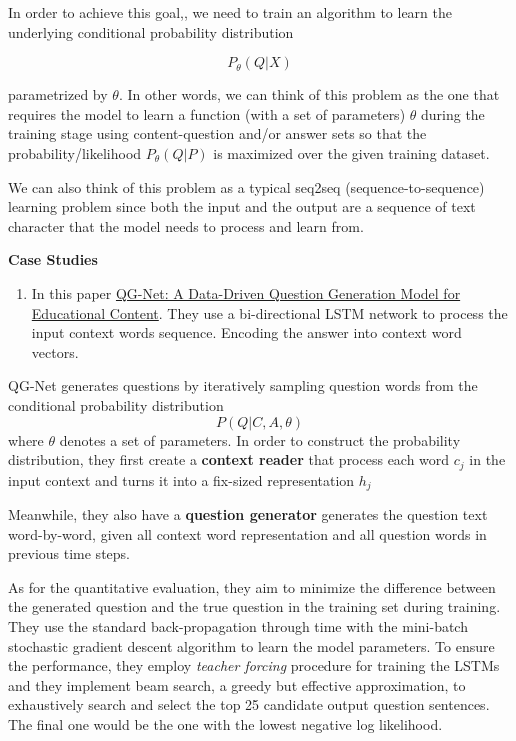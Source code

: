 \documentclass{acm_proc_article-sp}
\renewcommand{\paragraph}[1]{\vskip 6pt\noindent\textbf{#1 }}
\providecommand{\tightlist}{%
  \setlength{\itemsep}{0pt}\setlength{\parskip}{0pt}}
\begin{document}
In order to achieve this goal,, we need to train an algorithm to learn
the underlying conditional probability distribution

\[P_{\theta}(Q|X)\]

parametrized by \(\theta\). In other words, we can think of this problem
as the one that requires the model to learn a function (with a set of
parameters) \(\theta\) during the training stage using content-question
and/or answer sets so that the probability/likelihood
\(P_{\theta}(Q|P)\) is maximized over the given training dataset.

We can also think of this problem as a typical seq2seq
(sequence-to-sequence) learning problem since both the input and the
output are a sequence of text character that the model needs to process
and learn from.

\paragraph{Case Studies}\label{case-studies}

\begin{enumerate}
\def\labelenumi{\arabic{enumi}.}
\tightlist
\item
  In this paper
  \href{http://www.princeton.edu/~shitingl/papers/18l@s-qgen.pdf}{QG-Net:
  A Data-Driven Question Generation Model for Educational Content}. They
  use a bi-directional LSTM network to process the input context words
  sequence. Encoding the answer into context word vectors.
\end{enumerate}

QG-Net generates questions by iteratively sampling question words from
the conditional probability distribution \[P(Q|C,A,\theta)\] where
\(\theta\) denotes a set of parameters. In order to construct the
probability distribution, they first create a \textbf{context reader}
that process each word \(c_j\) in the input context and turns it into a
fix-sized representation \(h_j\)

Meanwhile, they also have a \textbf{question generator} generates the
question text word-by-word, given all context word representation and
all question words in previous time steps.

As for the quantitative evaluation, they aim to minimize the difference
between the generated question and the true question in the training set
during training. They use the standard back-propagation through time
with the mini-batch stochastic gradient descent algorithm to learn the
model parameters. To ensure the performance, they employ \emph{teacher
forcing} procedure for training the LSTMs and they implement beam
search, a greedy but effective approximation, to exhaustively search and
select the top 25 candidate output question sentences. The final one
would be the one with the lowest negative log likelihood.
\end{document}
